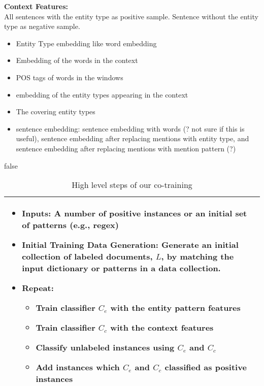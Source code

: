 \textbf{Context Features:}\\
All sentences with the entity type as positive sample.
Sentence without the entity type as negative sample.
\begin{itemize}
\item{Entity Type embedding like word embedding}
\item{Embedding of the words in the context}
\item{POS tags of words in the windows}
\item{embedding of the entity types  appearing in the context}
\item{The covering entity types}
\item{sentence embedding: 
sentence embedding with words (? not sure if this is useful), 
sentence embedding after replacing mentions with entity type, and 
sentence embedding after replacing mentions with mention pattern (?)
}
\end{itemize}

\if false
\begin{table*}[ht]
\centering
\begin{tabular}{p{}}
\toprule
\begin{itemize}
\item \textbf{Inputs:} A number of positive instances or an initial set of patterns (e.g., regex) 
\item \textbf{Initial Training Data Generation:} 
 Generate an initial collection of labeled documents, $L$, by matching the input dictionary or patterns in a data collection.
\item \textbf{Repeat:} 
\begin{itemize}
\item Train classifier $C_e$ with the entity pattern features
\item Train classifier $C_c$ with the context features 
\item Classify unlabeled instances using $C_e$ and $C_c$ 
\item Add instances which $C_e$ and $C_c$ classified as positive instances
\end{itemize}
\end{itemize} \\
\bottomrule
\end{tabular}
\caption{High level steps of our co-training}
\label{alg:main}
\end{table*}

\fi

